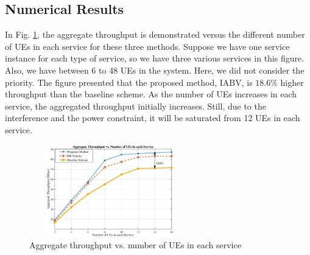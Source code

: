 \documentclass[lettersize,journal]{IEEEtran}
\begin{document}
\subsection{Numerical Results}
In Fig. \ref{fig:1}, the aggregate throughput is demonstrated versus the different number of UEs in each service for these three methods. Suppose we have one service instance for each type of service, so we have three various services in this figure. Also, we have between 6 to 48 UEs in the system.
Here, we did not consider the priority. The figure presented that the proposed method, IABV, is $18.6\%$ higher throughput than the baseline scheme.
As the number of UEs increases in each service, the aggregated throughput initially increases. Still, due to the interference and the power constraint, it will be saturated from 12 UEs in each service.
\begin{figure}%
  \centering
  \captionsetup{justification=centering}
    \includegraphics[width=7cm,height=4cm]{Arate_ue1_1.eps}
    \caption{Aggregate throughput vs. number of UEs in each service}%
    \label{fig:1}
\end{figure}
\end{document}
